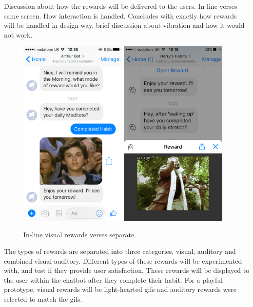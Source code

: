 Discussion about how the rewards will be delivered to the users. In-line verses same screen. How interaction is handled. Concludes with exactly how rewards will be handled in design way, brief discussion about vibration and how it would not work.

\begin{figure}[H]
  \centering
  \includegraphics[width=2.1in]{../resources/design/reward-visual-inline.png}
  \hspace{10px}
  \includegraphics[width=2.1in]{../resources/design/reward-visual-2.png}
  \caption{In-line visual rewards verses separate.}
  \label{fig:rewards_inline_v_website}
\end{figure}

The types of rewards are separated into three categories, visual, auditory and combined visual-auditory. Different types of these rewards will be experimented with,
and test if they provide user satisfaction. These rewards will be displayed to the user within the chatbot after they complete their habit.
For a playful prototype, visual rewards will be light-hearted gifs and auditory rewards were selected to match the gifs.

